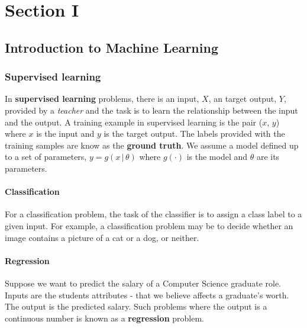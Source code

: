 \documentclass[11pt,fleqn]{book} %
\begin{document}
\part{Section I}



\chapter{Introduction to Machine Learning}

\section{Supervised learning}
In \textbf{supervised learning} problems, there is an input, $X$, an target output, $Y$, provided by a \textit{teacher} and the task is to learn the relationship between the input and the output. A training example in supervised learning is the pair ($x$, $y$) where $x$ is the input and $y$ is the target output. The labels provided with the training samples are know as the \textbf{ground truth}. We assume a model defined up to a set of parameters, $y = g(x \, \vert \, \theta)$ where $g(\cdot)$ is the model and $\theta$ are its parameters.
\subsection{Classification}
For a classification problem, the task of the classifier is to assign a class label to a given input. For example, a classification problem may be to decide whether an image contains a picture of a cat or a dog, or neither.

\subsection{Regression}
Suppose we want to predict the salary of a Computer Science graduate role. Inputs are the students attributes - that we believe affects a graduate's worth. The output is the predicted salary. Such problems where the output is a continuous number is known as a \textbf{regression} problem.
\end{document}
